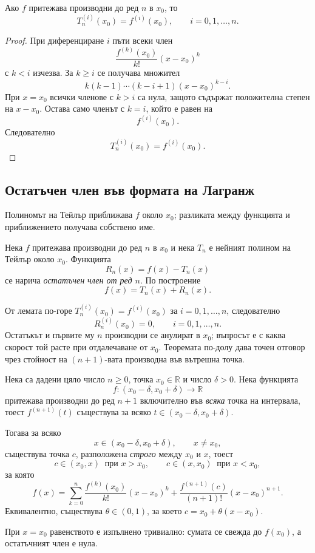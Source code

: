 \begin{lem}
Ако $f$ притежава производни до ред $n$ в $x_0$, то
\[
T_n^{(i)}(x_0)=f^{(i)}(x_0),
\qquad i=0,1,\ldots,n.
\]
\end{lem}

\begin{proof}
При диференциране $i$ пъти всеки член
\[
\frac{f^{(k)}(x_0)}{k!}(x-x_0)^k
\]
с $k<i$ изчезва. За $k\geq i$ се получава множител
\[
k(k-1)\cdots(k-i+1)(x-x_0)^{k-i}.
\]
При $x=x_0$ всички членове с $k>i$ са нула, защото съдържат положителна степен на $x-x_0$. Остава само членът с $k=i$, който е равен на
\[
f^{(i)}(x_0).
\]
Следователно
\[
T_n^{(i)}(x_0)=f^{(i)}(x_0).
\]
\end{proof}

\subsection{Остатъчен член във формата на Лагранж}\label{s:32.3.2}

Полиномът на Тейлър приближава $f$ около $x_0$; разликата между функцията и приближението получава собствено име.

\begin{defn}
Нека $f$ притежава производни до ред $n$ в $x_0$ и нека $T_n$ е нейният полином на Тейлър около $x_0$. Функцията
\[
R_n(x)=f(x)-T_n(x)
\]
се нарича \emph{остатъчен член от ред $n$}. По построение
\[
f(x)=T_n(x)+R_n(x).
\]
\end{defn}

От лемата по-горе $T_n^{(i)}(x_0)=f^{(i)}(x_0)$ за $i=0,1,\ldots,n$, следователно
\[
R_n^{(i)}(x_0)=0,\qquad i=0,1,\ldots,n.
\]
Остатъкът и първите му $n$ производни се анулират в $x_0$; въпросът е с каква скорост той расте при отдалечаване от $x_0$. Теоремата по-долу дава точен отговор чрез стойност на $(n+1)$-вата производна във вътрешна точка.

\begin{keythm}
Нека са дадени цяло число $n\geq 0$, точка $x_0\in\mathbb{R}$ и число $\delta>0$. Нека функцията
\[
f:(x_0-\delta,x_0+\delta)\to\mathbb{R}
\]
притежава производни до ред $n+1$ включително във \emph{всяка} точка на интервала, тоест $f^{(n+1)}(t)$ съществува за всяко $t\in(x_0-\delta,x_0+\delta)$.

Тогава за всяко
\[
x\in(x_0-\delta,x_0+\delta),\qquad x\ne x_0,
\]
съществува точка $c$, разположена \emph{строго} между $x_0$ и $x$, тоест
\[
c\in(x_0,x)\ \text{ при } x>x_0,
\qquad
c\in(x,x_0)\ \text{ при } x<x_0,
\]
за която
\[
f(x)
=
\sum_{k=0}^{n}\frac{f^{(k)}(x_0)}{k!}(x-x_0)^k
+
\frac{f^{(n+1)}(c)}{(n+1)!}(x-x_0)^{n+1}.
\]
Еквивалентно, съществува $\theta\in(0,1)$, за което $c=x_0+\theta(x-x_0)$.

При $x=x_0$ равенството е изпълнено тривиално: сумата се свежда до $f(x_0)$, а остатъчният член е нула.
\end{keythm}

